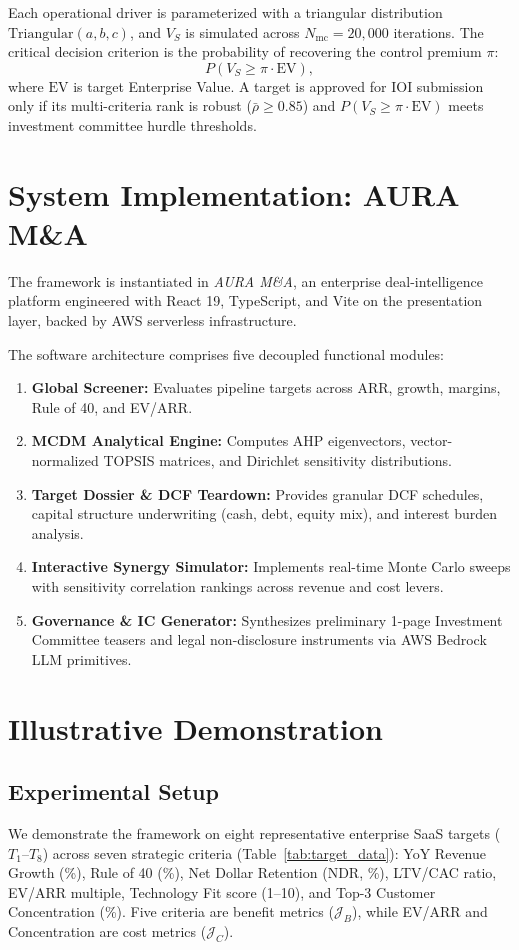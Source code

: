 \documentclass[conference]{IEEEtran}
\begin{document}
Each operational driver is parameterized with a triangular distribution $\mathrm{Triangular}(a, b, c)$, and $V_S$ is simulated across $N_{\text{mc}} = 20,000$ iterations. The critical decision criterion is the probability of recovering the control premium $\pi$:
\begin{equation}
P(V_S \ge \pi \cdot \mathrm{EV}),
\end{equation}
where $\mathrm{EV}$ is target Enterprise Value. A target is approved for IOI submission only if its multi-criteria rank is robust ($\bar{\rho} \ge 0.85$) and $P(V_S \ge \pi \cdot \mathrm{EV})$ meets investment committee hurdle thresholds.

\section{System Implementation: AURA M\&A}
The framework is instantiated in \textit{AURA M\&A}, an enterprise deal-intelligence platform engineered with React 19, TypeScript, and Vite on the presentation layer, backed by AWS serverless infrastructure. 

The software architecture comprises five decoupled functional modules:
\begin{enumerate}
    \item \textbf{Global Screener:} Evaluates pipeline targets across ARR, growth, margins, Rule of 40, and EV/ARR.
    \item \textbf{MCDM Analytical Engine:} Computes AHP eigenvectors, vector-normalized TOPSIS matrices, and Dirichlet sensitivity distributions.
    \item \textbf{Target Dossier \& DCF Teardown:} Provides granular DCF schedules, capital structure underwriting (cash, debt, equity mix), and interest burden analysis.
    \item \textbf{Interactive Synergy Simulator:} Implements real-time Monte Carlo sweeps with sensitivity correlation rankings across revenue and cost levers.
    \item \textbf{Governance \& IC Generator:} Synthesizes preliminary 1-page Investment Committee teasers and legal non-disclosure instruments via AWS Bedrock LLM primitives.
\end{enumerate}

\section{Illustrative Demonstration}
\subsection{Experimental Setup}
We demonstrate the framework on eight representative enterprise SaaS targets ($T_1$--$T_8$) across seven strategic criteria (Table~\ref{tab:target_data}): YoY Revenue Growth (\%), Rule of 40 (\%), Net Dollar Retention (NDR, \%), LTV/CAC ratio, EV/ARR multiple, Technology Fit score (1--10), and Top-3 Customer Concentration (\%). Five criteria are benefit metrics ($\mathcal{J}_B$), while EV/ARR and Concentration are cost metrics ($\mathcal{J}_C$).
\end{document}
